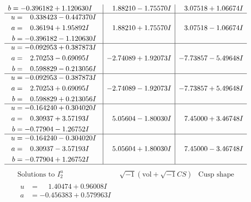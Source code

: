 \documentclass[1p]{elsarticle_modified}
\theoremstyle{definition}
\newcommand{\I}{\sqrt{-1}}
\begin{document}
$$\begin{array}{c|c|c}
\begin{aligned}
b &= -0.396182 + 1.120630 I\end{aligned}
 & \phantom{-}1.88210 - 1.75570 I & \phantom{-}3.07518 + 1.06674 I \\ \hline\begin{aligned}
u &= \phantom{-}0.338423 - 0.447370 I \\
a &= \phantom{-}0.36194 + 1.95892 I \\
b &= -0.396182 - 1.120630 I\end{aligned}
 & \phantom{-}1.88210 + 1.75570 I & \phantom{-}3.07518 - 1.06674 I \\ \hline\begin{aligned}
u &= -0.092953 + 0.387873 I \\
a &= \phantom{-}2.70253 - 0.69095 I \\
b &= \phantom{-}0.598829 - 0.213056 I\end{aligned}
 & -2.74089 + 1.92073 I & -7.73857 - 5.49648 I \\ \hline\begin{aligned}
u &= -0.092953 - 0.387873 I \\
a &= \phantom{-}2.70253 + 0.69095 I \\
b &= \phantom{-}0.598829 + 0.213056 I\end{aligned}
 & -2.74089 - 1.92073 I & -7.73857 + 5.49648 I \\ \hline\begin{aligned}
u &= -0.164240 + 0.304020 I \\
a &= \phantom{-}0.30937 + 3.57193 I \\
b &= -0.77904 - 1.26752 I\end{aligned}
 & \phantom{-}5.05604 - 1.80030 I & \phantom{-}7.45000 + 3.46748 I \\ \hline\begin{aligned}
u &= -0.164240 - 0.304020 I \\
a &= \phantom{-}0.30937 - 3.57193 I \\
b &= -0.77904 + 1.26752 I\end{aligned}
 & \phantom{-}5.05604 + 1.80030 I & \phantom{-}7.45000 - 3.46748 I\\
 \hline 
 \end{array}$$\newpage$$\begin{array}{c|c|c}  
\text{Solutions to }I^u_{2}& \I (\text{vol} + \sqrt{-1}CS) & \text{Cusp shape}\\
 \hline 
\begin{aligned}
u &= \phantom{-}1.40474 + 0.96008 I \\
a &= -0.456383 + 0.579963 I \\

\end{aligned}
\end{array}$$
\end{document}
